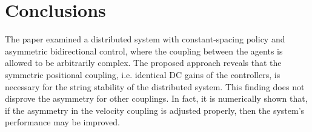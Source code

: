 \documentclass[10pt,twocolumn,twoside]{IEEEtran}
\theoremstyle{definition}
\begin{document}
\section{Conclusions}
The paper examined a distributed system with constant-spacing policy and asymmetric bidirectional control, where the coupling between the agents is allowed to be arbitrarily complex. The proposed approach reveals that the symmetric positional coupling, i.e. identical DC gains of the controllers, is necessary for the string stability of the distributed system. This finding does not disprove the asymmetry for other couplings. In fact, it is numerically shown that, if the asymmetry in the velocity coupling is adjusted properly, then the system's performance may be improved.













\end{document}
